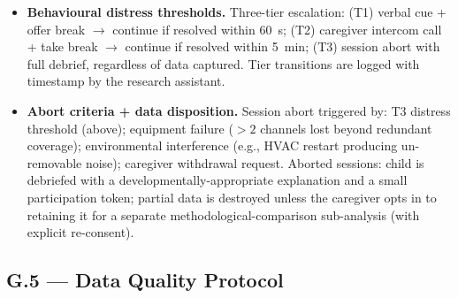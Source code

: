 \begin{itemize}[leftmargin=*, itemsep=4pt]
    \item \textbf{Behavioural distress thresholds.} Three-tier escalation: (T1) verbal cue + offer break $\to$ continue if resolved within 60~s; (T2) caregiver intercom call + take break $\to$ continue if resolved within 5~min; (T3) session abort with full debrief, regardless of data captured. Tier transitions are logged with timestamp by the research assistant.

    \item \textbf{Abort criteria + data disposition.} Session abort triggered by: T3 distress threshold (above); equipment failure ($>2$ channels lost beyond redundant coverage); environmental interference (e.g., HVAC restart producing un-removable noise); caregiver withdrawal request. Aborted sessions: child is debriefed with a developmentally-appropriate explanation and a small participation token; partial data is destroyed unless the caregiver opts in to retaining it for a separate methodological-comparison sub-analysis (with explicit re-consent).
\end{itemize}

\subsection*{G.5 --- Data Quality Protocol}
\label{subsec:appg_data_quality}



